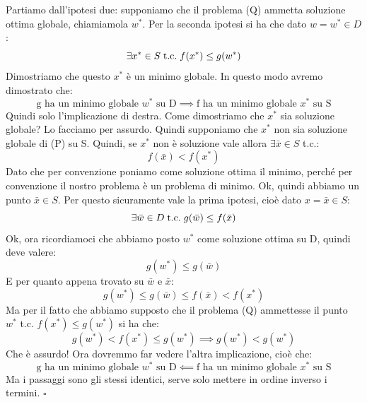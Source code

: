 Partiamo dall'ipotesi due: supponiamo che il problema (Q) ammetta soluzione ottima globale, chiamiamola $w^*$. Per la seconda ipotesi si ha che dato $w = w^* \in  D$:
\begin{equation*}
    \exists x^* \in S \hspace{0.1cm} \text{t.c.} \hspace{0.1cm} f(x^*) \leq g(w^*)
\end{equation*}
Dimostriamo che questo $x^*$ è un minimo globale. In questo modo avremo dimostrato che:
\begin{equation*}
    \text{g ha un minimo globale $w^*$ su D} \implies \text{f ha un minimo globale $x^*$ su S}
\end{equation*}
Quindi solo l'implicazione di destra. Come dimostriamo che $x^*$ sia soluzione globale? Lo facciamo per assurdo. Quindi supponiamo che $x^*$ non sia soluzione globale di (P) su S. Quindi, se $x^*$ non è soluzione vale allora $\exists \bar{x} \in S$ t.c.:
\begin{equation*}
    f(\bar{x}) < f(x^*)
\end{equation*}
Dato che per convenzione poniamo come soluzione ottima il minimo, perché per convenzione il nostro problema è un problema di minimo. Ok, quindi abbiamo un punto $\bar{x} \in S$. Per questo sicuramente vale la prima ipotesi, cioè dato $x = \bar{x} \in  S$:
\begin{equation*}
    \exists \bar{w} \in D \hspace{0.1cm} \text{t.c.} \hspace{0.1cm} g(\bar{w}) \leq f(\bar{x})
\end{equation*}
Ok, ora ricordiamoci che abbiamo posto $w^*$ come soluzione ottima su D, quindi deve valere:
\begin{equation*}
    g(w^*) \leq g(\bar{w})
\end{equation*}
E per quanto appena trovato su $\bar{w}$ e $\bar{x}$:
\begin{equation*}
    g(w^*) \leq g(\bar{w}) \leq f(\bar{x}) < f(x^*)
\end{equation*}
Ma per il fatto che abbiamo supposto che il problema (Q) ammettesse il punto $w^*$ t.c. $f(x^*) \leq g(w^*)$ si ha che:
\begin{equation*}
    g(w^*) < f(x^*) \leq g(w^*) \implies g(w^*) < g(w^*)
\end{equation*}
Che è assurdo! Ora dovremmo far vedere l'altra implicazione, cioè che:
\begin{equation*}
    \text{g ha un minimo globale $w^*$ su D} \impliedby \text{f ha un minimo globale $x^*$ su S} 
\end{equation*}
Ma i passaggi sono gli stessi identici, serve solo mettere in ordine inverso i termini. $\square$



